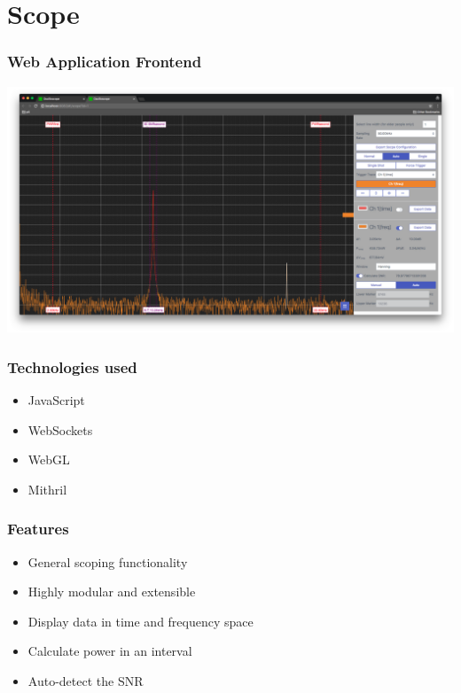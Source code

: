 \section{Scope}

\begin{frame}
    \frametitle{Web Application Frontend}

    \centering
    \includegraphics[width=1\textwidth]{images/scope}
    
\end{frame}

\begin{frame}
    \frametitle{Technologies used}

    \begin{itemize}
        \item
            JavaScript
        \item
            WebSockets
        \item
            WebGL
        \item
            Mithril
    \end{itemize}
\end{frame}

\begin{frame}
    \frametitle{Features}

    \begin{itemize}
        \item
            General scoping functionality
        \item
            Highly modular and extensible
        \item
            Display data in time and frequency space
        \item
            Calculate power in an interval
        \item
            Auto-detect the SNR
    \end{itemize}
\end{frame}